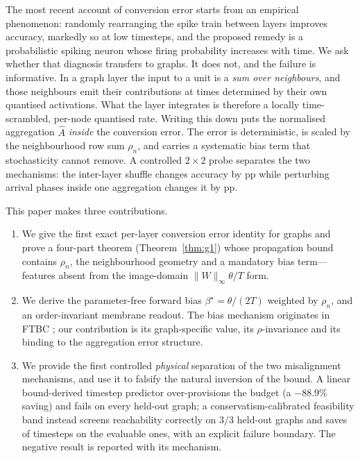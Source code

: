 \documentclass[10pt,twocolumn]{article}
\newcommand{\Ahat}{\hat{A}}
\newcommand{\betastar}{\beta^{\star}}
\newcommand{\rhon}{\rho_n}
\begin{document}
The most recent account of conversion error \cite{tpp2025} starts from an empirical phenomenon:
randomly rearranging the spike train between layers improves accuracy, markedly so at low
timesteps, and the proposed remedy is a probabilistic spiking neuron whose firing probability
increases with time. We ask whether that diagnosis transfers to graphs. It does not, and the
failure is informative. In a graph layer the input to a unit is a \emph{sum over neighbours}, and
those neighbours emit their contributions at times determined by their own quantised activations.
What the layer integrates is therefore a locally time-scrambled, per-node quantised rate. Writing
this down puts the normalised aggregation $\Ahat$ \emph{inside} the conversion error. The error is
deterministic, is scaled by the neighbourhood row sum $\rhon$, and carries a systematic bias term
that stochasticity cannot remove. A controlled $2\times2$ probe separates the two mechanisms: the
inter-layer shuffle changes accuracy by \soneInter{} pp while perturbing arrival phases inside one
aggregation changes it by \soneIntra{} pp. %

This paper makes three contributions.
\begin{enumerate}
\item We give the first exact per-layer conversion error identity for graphs and prove a
four-part theorem (Theorem~\ref{thm:g1}) whose propagation bound contains $\rhon$, the
neighbourhood geometry and a mandatory bias term---features absent from the image-domain
$\|W\|_{\infty}\theta/T$ form.
\item We derive the parameter-free forward bias $\betastar=\theta/(2T)$ weighted by $\rhon$, and
an order-invariant membrane readout. The bias mechanism originates in FTBC \cite{ftbc2024}; our
contribution is its graph-specific value, its $\rho$-invariance and its binding to the aggregation
error structure.
\item We provide the first controlled \emph{physical} separation of the two misalignment
mechanisms, and use it to falsify the natural inversion of the bound. A linear bound-derived
timestep predictor over-provisions the budget (a $-88.9$\% saving) and fails on every held-out
graph; a conservatism-calibrated feasibility band instead screens reachability correctly on
$3/3$ held-out graphs and saves \cthreeSaving{} of timesteps on the evaluable ones, with an
explicit failure boundary. The negative result is reported with its mechanism. %
\end{enumerate}
\end{document}
